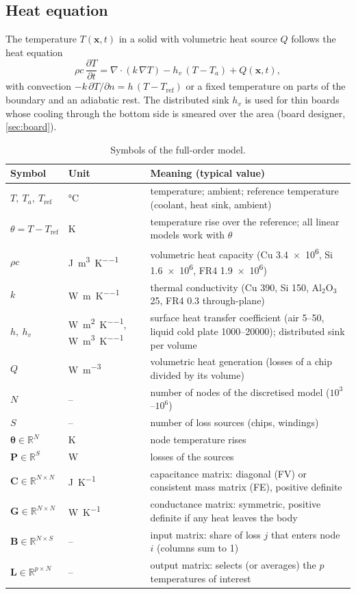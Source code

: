 \documentclass[11pt,a4paper]{article}
\newcommand{\Tref}{T_{\mathrm{ref}}}
\newcommand{\mat}[1]{\bm{#1}}
\newcommand{\R}{\mathbb{R}}
\begin{document}
\subsection{Heat equation}
The temperature $T(\bm x,t)$ in a solid with volumetric heat source $Q$ follows the heat equation
\begin{equation}
  \rho c\,\frac{\partial T}{\partial t} = \nabla\cdot\left(k\,\nabla T\right) - h_v\,(T-T_a) + Q(\bm x,t),
  \label{eq:heat}
\end{equation}
with convection $-k\,\partial T/\partial n = h\,(T-\Tref)$ or a fixed temperature on parts of the boundary and an
adiabatic rest. The distributed sink $h_v$ is used for thin boards whose cooling through the bottom side is smeared
over the area (board designer, \cref{sec:board}).

\begin{table}[h]\centering\small
\caption{Symbols of the full-order model.}
\begin{tabularx}{\linewidth}{@{}llX@{}}\toprule
Symbol & Unit & Meaning (typical value) \\\midrule
$T,\ T_a,\ \Tref$ & \si{\celsius} & temperature; ambient; reference temperature (coolant, heat sink, ambient) \\
$\theta = T-\Tref$ & \si{\kelvin} & temperature rise over the reference; all linear models work with $\theta$ \\
$\rho c$ & \si{\joule\per\cubic\metre\per\kelvin} & volumetric heat capacity (Cu \num{3.4e6}, Si \num{1.6e6}, FR4 \num{1.9e6}) \\
$k$ & \si{\watt\per\metre\per\kelvin} & thermal conductivity (Cu 390, Si 150, Al$_2$O$_3$ 25, FR4 0.3 through-plane) \\
$h,\ h_v$ & \si{\watt\per\square\metre\per\kelvin}, \si{\watt\per\cubic\metre\per\kelvin} & surface heat
  transfer coefficient (air 5--50, liquid cold plate 1000--20000); distributed sink per volume \\
$Q$ & \si{\watt\per\cubic\metre} & volumetric heat generation (losses of a chip divided by its volume) \\
$N$ & -- & number of nodes of the discretised model ($10^3$--$10^6$) \\
$S$ & -- & number of loss sources (chips, windings) \\
$\bm\theta\in\R^N$ & \si{\kelvin} & node temperature rises \\
$\bm P\in\R^S$ & \si{\watt} & losses of the sources \\
$\mat C\in\R^{N\times N}$ & \si{\joule\per\kelvin} & capacitance matrix: diagonal (FV) or consistent mass matrix (FE), positive definite \\
$\mat G\in\R^{N\times N}$ & \si{\watt\per\kelvin} & conductance matrix: symmetric, positive definite if any heat leaves the body \\
$\mat B\in\R^{N\times S}$ & -- & input matrix: share of loss $j$ that enters node $i$ (columns sum to 1) \\
$\mat L\in\R^{p\times N}$ & -- & output matrix: selects (or averages) the $p$ temperatures of interest \\\bottomrule
\end{tabularx}
\label{tab:fomsym}
\end{table}
\end{document}
